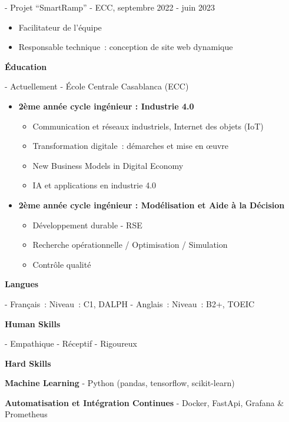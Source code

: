 \documentclass[11pt]{article}
\newcommand{\subsectiontitle}[1]{\noindent\textbf{#1}}
\begin{document}
\begin{multicols}{2}
- Projet “SmartRamp” - ECC, septembre 2022 - juin 2023
    \begin{itemize}[itemsep=0pt, topsep=0pt, partopsep=0pt]
        \item Facilitateur de l'équipe
        \item Responsable technique : conception de site web dynamique
    \end{itemize}

\subsectiontitle{Éducation}

- Actuellement - École Centrale Casablanca (ECC)
\begin{itemize}[itemsep=0pt, topsep=0pt, partopsep=0pt]
    \item \textbf{2ème année cycle ingénieur : Industrie 4.0}
        \begin{itemize}[itemsep=0pt, topsep=0pt, partopsep=0pt]
            \item Communication et réseaux industriels, Internet des objets (IoT)
            \item Transformation digitale : démarches et mise en œuvre
            \item New Business Models in Digital Economy
            \item IA et applications en industrie 4.0
        \end{itemize}

    \item \textbf{2ème année cycle ingénieur : Modélisation et Aide à la Décision}
        \begin{itemize}[itemsep=0pt, topsep=0pt, partopsep=0pt]
            \item Développement durable - RSE
            \item Recherche opérationnelle / Optimisation / Simulation
            \item Contrôle qualité
        \end{itemize}
\end{itemize}

\subsectiontitle{Langues}

- Français : Niveau : C1, DALPH
- Anglais : Niveau : B2+, TOEIC

\subsectiontitle{Human Skills}

- Empathique
- Réceptif
- Rigoureux

\subsectiontitle{Hard Skills}

\textbf{Machine Learning}
- Python (pandas, tensorflow, scikit-learn)

\textbf{Automatisation et Intégration Continues}
- Docker, FastApi, Grafana \& Prometheus


\end{multicols}
\end{document}
